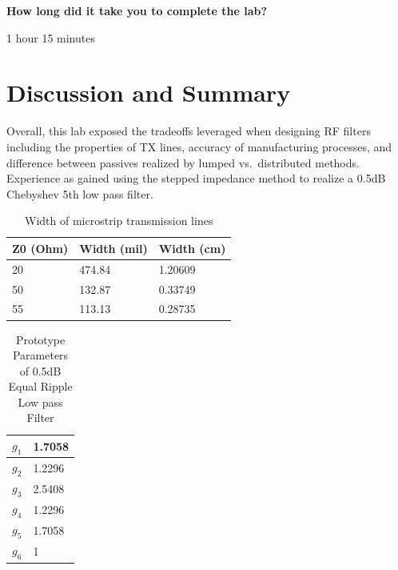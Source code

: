 \documentclass[journal]{IEEEtran}
\begin{document}
\textbf{How long did it take you to complete the lab?}

1 hour 15 minutes

\section{Discussion and Summary}

Overall, this lab exposed the tradeoffs leveraged when designing RF filters
including the properties of TX lines, accuracy of manufacturing processes, and
difference between passives realized by lumped vs.\ distributed methods.
Experience as gained using the stepped impedance method to realize a 0.5dB
Chebyshev 5th low pass filter.

\appendices

\begin{table}[]
    \centering
    \begin{tabular}{lll}
        \toprule
        Z0 (Ohm) & Width (mil) & Width (cm) \\ \midrule
        20       & 474.84      & 1.20609    \\ \midrule
        50       & 132.87      & 0.33749    \\ \midrule
        55       & 113.13      & 0.28735    \\ \bottomrule
    \end{tabular}

    \vspace{1em}
    \caption{Width of microstrip transmission lines}
    \label{tab:tx_dims}
\end{table}

\begin{table}[]
    \centering
    \begin{tabular}{ll}
        \toprule
        \(g_1\) & 1.7058 \\ \midrule
        \(g_2\) & 1.2296 \\ \midrule
        \(g_3\) & 2.5408 \\ \midrule
        \(g_4\) & 1.2296 \\ \midrule
        \(g_5\) & 1.7058 \\ \midrule
        \(g_6\) & 1      \\ \bottomrule
    \end{tabular}

    \vspace{1em}
    \caption{Prototype Parameters of 0.5dB Equal Ripple Low pass Filter}
    \label{tab:prototype_params}
\end{table}
\end{document}
